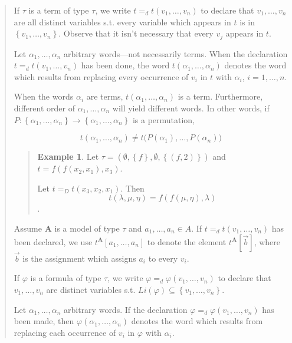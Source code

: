 \documentclass[a4paper, 12pt]{article}
\theoremstyle{definition}
\theoremstyle{definition}
\newtheorem{example}{Example}
\theoremstyle{definition}
\begin{document}
\begin{quote}
If $\tau$ is a term of type $\tau$, we write $t =_d t(v_1, \ldots, v_n)$ to
declare that $v_1, \ldots, v_n$ are all distinct variables s.t. every variable
which appears in $t$ is in $\left\{ v_1, \ldots, v_n \right\} $. Observe that
it isn't necessary that every $v_j$ appears in $t$.


Let $\alpha_1, \ldots, \alpha_n$ arbitrary words---not necessarily terms. When
the declaration $t =_d t(v_1, \ldots, v_n)$ has been done, the word
$t(\alpha_1, \ldots, \alpha_n)$ denotes the word which results from replacing
every occurrence of $v_i$ in $t$  with $\alpha_i$, $i = 1, \ldots, n$.

When the words $\alpha_i$ are terms, $t(\alpha_1, \ldots, \alpha_n)$ is 
a term. Furthermore, different order of $\alpha_1, \ldots, \alpha_n$ 
will yield different words. In other words, if 
$P : \left\{ \alpha_1, \ldots, \alpha_n \right\} \to \left\{ \alpha_1, \ldots, \alpha_n \right\} $
is a permutation, 

\begin{equation*}
    t(\alpha_1, \ldots, \alpha_n) \neq t\big( P(\alpha_1), \ldots, P(\alpha_n) \big)
\end{equation*}


\small
\begin{quote}

\begin{example}
    Let $\tau = \left( \emptyset, \left\{ f \right\}, \emptyset, \left\{ (f, 2) \right\}   \right) $
    and $t = f\left( f\left( x_2, x_1 \right), x_3  \right) $. 

    Let $t =_D t(x_3, x_2, x_1)$. Then $$t(\lambda, \mu, \eta) = f\left( f\left( \mu, \eta \right), \lambda  \right) $$.
\end{example}

\end{quote}
\normalsize

Assume $\textbf{A}$ is a model of type $\tau$ and $a_1, \ldots, a_n \in A$. If
$t =_d t(v_1, \ldots, v_n)$ has been declared, we use $t^\textbf{A}[a_1,
\ldots, a_n]$ to denote the element $t^\textbf{A}[\overrightarrow{b}]$, where
$\overrightarrow{b}$ is the assignment which assigns $a_i$ to every $v_i$.

If $\varphi$ is a formula of type $\tau$, we write $\varphi =_d \varphi(v_1,
\ldots, v_n)$ to declare that $v_1, \ldots, v_n$ are distinct variables s.t.
$Li(\varphi) \subseteq \left\{ v_1, \ldots, v_n \right\} $.

Let $\alpha_1, \ldots, \alpha_n$ arbitrary words. If the declaration $\varphi
=_d \varphi(v_1, \ldots, v_n)$ has been made, then $\varphi(\alpha_1, \ldots,
\alpha_n)$ denotes the word which results from replacing each occurrence of
$v_i$ in $\varphi$ with $\alpha_i$.


\end{quote}
\end{document}

